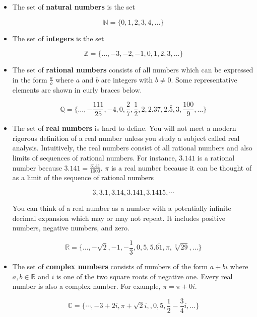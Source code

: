 \begin{itemize}
		\item The set of \textbf{natural numbers} is the set
		
		\[
		\mathbb{N} = \{0,1,2,3,4, \dots \}
		\]
		
		\item The set of \textbf{integers} is the set
		
		\[
		\mathbb{Z} = \{\dots, -3,-2,-1,0,1,2,3,\dots\}
		\]
		
		\item The set of \textbf{rational numbers} consists of all numbers which can be expressed in the form $\frac{a}{b}$ where $a$ and $b$ are integers with $b \neq 0$.  Some representative elements are shown in curly braces below.
		
		\[
		\mathbb{Q} = \{ \dots,  -\frac{111}{25},-4,0,\frac{2}{7}, \frac{1}{2}, 2, 2.37, 2.\bar{5}, 3, \frac{100}{9}, \dots\}
		\] 
		
		\item The set of \textbf{real numbers} is hard to define.  You will not meet a modern rigorous definition of a real number unless you study a subject called real analysis.  Intuitively, the real numbers consist of all rational numbers and also limits of sequences of rational numbers.  For instance, $3.141$ is a rational number because $3.141 = \frac{3141}{1000}$.  $\pi$ is a real number because it can be thought of as a limit of the sequence of rational numbers 
		
		\[3, 3.1, 3.14, 3.141, 3.1415, \cdots\]
		
		You can think of a real number as a number with a potentially infinite decimal expansion which may or may not repeat.  It includes positive numbers, negative numbers, and zero.
		
		\[
		\mathbb{R} = \{ \dots, -\sqrt{2}, -1, -\frac{1}{3}, 0, 5, 5.\overline{61}, \pi, \sqrt[3]{29}, \dots \}
		\]
		
		\item The set of \textbf{complex numbers} consists of numbers of the form $a+bi$ where $a,b \in \mathbb{R}$ and $i$ is one of the two square roots of negative one.  Every real number is also a complex number.  For example, $\pi = \pi + 0i$.
		
		\[
		\mathbb{C} = \{\cdots, -3+2i, \pi+\sqrt{2}i, ,0, 5, \frac{1}{2} - \frac{3}{4} i, \dots \}
		\]
	\end{itemize}

